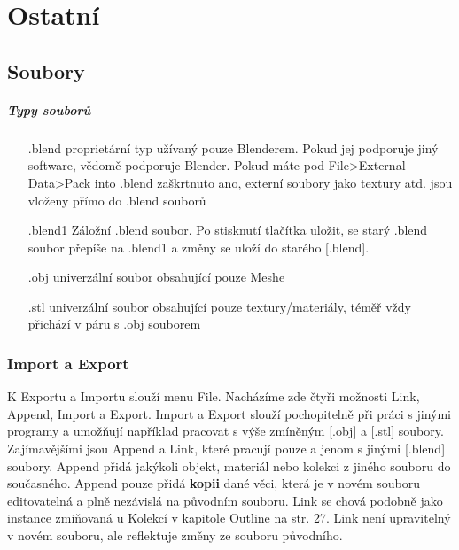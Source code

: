 \documentclass[12pt,a4paper]{report}
\begin{document}
	
	
	\chapter{Ostatní}
	\section{Soubory}
	\paragraph{Typy souborů}
	\begin{itemize}
		\item[.blend] proprietární typ užívaný pouze Blenderem. Pokud jej
podporuje jiný software, vědomě podporuje Blender. Pokud máte pod File>External Data>Pack into .blend
zaškrtnuto ano, externí soubory jako textury atd. jsou vloženy
přímo do .blend souborů
		\item[.blend1] Záložní .blend soubor. Po stisknutí tlačítka uložit, se
starý .blend soubor přepíše na .blend1 a změny se uloží do starého
[.blend].
		\item[.obj] univerzální soubor obsahující pouze Meshe
		\item[.stl] univerzální soubor obsahující pouze textury/materiály,
téměř vždy přichází v páru s .obj souborem
	\end{itemize}
	
	
	\subsection{Import a Export}
	K Exportu a Importu slouží menu File. Nacházíme zde čtyři možnosti Link,
	Append, Import a Export. Import a Export slouží pochopitelně při práci
	s jinými programy a umožňují například pracovat s výše zmíněným [.obj]
	a [.stl] soubory. Zajímavějšími jsou Append a Link, které pracují pouze a
	jenom s jinými [.blend] soubory. Append přidá jakýkoli objekt, materiál
	nebo kolekci z jiného souboru do současného. Append pouze přidá \textbf{kopii}
	dané věci, která je v novém souboru editovatelná a plně nezávislá na
	původním souboru. Link se chová podobně jako instance zmiňovaná u
	Kolekcí v kapitole Outline na str. 27. Link není upravitelný v novém
	souboru, ale reflektuje změny ze souboru původního.
	
	
\end{document}
